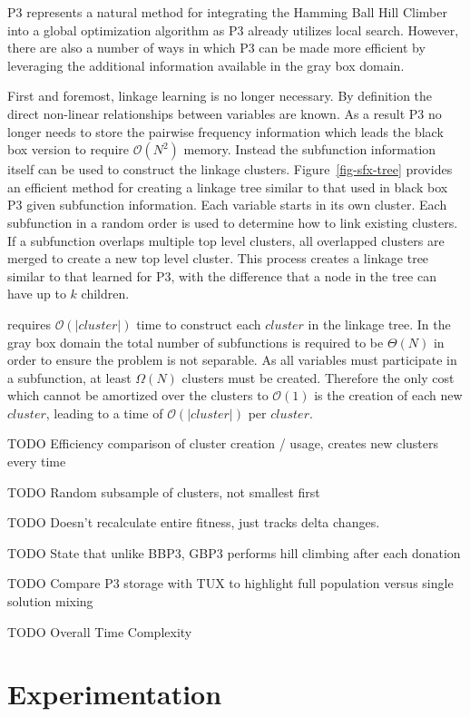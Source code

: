 \documentclass{sig-alternate}
\newcommand{\BigO}[1]{$\mathcal{O}{(#1)}$}
\begin{document}
P3 represents a natural method for integrating the Hamming Ball Hill Climber into
a global optimization algorithm as P3 already utilizes local search. However, there
are also a number of ways in which P3 can be made more efficient by leveraging the
additional information available in the gray box domain.

First and foremost, linkage learning is no longer necessary. By definition
the direct non-linear relationships between variables are known. As a result
P3 no longer needs to store the pairwise frequency information which leads
the black box version to require \BigO{N^2} memory. Instead the subfunction
information itself can be used to construct the linkage clusters.
Figure~\ref{fig-sfx-tree} provides an efficient method for creating a linkage
tree similar to that used in black box P3 given subfunction information.
Each variable starts in its own cluster. Each subfunction in a random order
is used to determine how to link existing clusters. If a subfunction overlaps
multiple top level clusters, all overlapped clusters are merged to create a new
top level cluster. This process creates a linkage tree similar to that learned
for P3, with the difference that a node in the tree can have up to $k$ children.

 requires \BigO{|cluster|} time to construct each $cluster$
in the linkage tree. In the gray box domain the total number of subfunctions is required
to be $\Theta(N)$ in order to ensure the problem is not separable. As all variables must
participate in a subfunction, at least $\Omega(N)$ clusters must be created. Therefore
the only cost which cannot be amortized over the clusters to \BigO{1} is the creation
of each new $cluster$, leading to a time of \BigO{|cluster|} per $cluster$.

TODO Efficiency comparison of cluster creation / usage, creates new clusters every time

TODO Random subsample of clusters, not smallest first

TODO Doesn't recalculate entire fitness, just tracks delta changes.

TODO State that unlike BBP3, GBP3 performs hill climbing after each donation

TODO Compare P3 storage with TUX to highlight full population versus single solution mixing

TODO Overall Time Complexity

\section{Experimentation}
\label{sec-experiments}
~\cite{wright:2000:solvingnk}
\end{document}
